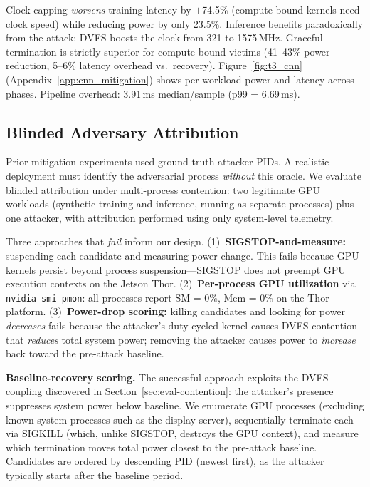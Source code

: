 \documentclass[letterpaper,twocolumn,10pt]{article}
\begin{document}
Clock capping \emph{worsens} training latency by $+$74.5\%
(compute-bound kernels need clock speed) while reducing power by
only 23.5\%.  Inference benefits paradoxically from the attack:
DVFS boosts the clock from 321 to 1575\,MHz.  Graceful termination
is strictly superior for compute-bound victims (41--43\% power
reduction, 5--6\% latency overhead vs.\ recovery).
Figure~\ref{fig:t3_cnn} (Appendix~\ref{app:cnn_mitigation})
shows per-workload power and latency across phases.
Pipeline overhead: 3.91\,ms median/sample (p99 = 6.69\,ms).

\subsection{Blinded Adversary Attribution}
\label{sec:mit-attribution}

Prior mitigation experiments used ground-truth attacker PIDs.
A realistic deployment must identify the adversarial process
\emph{without} this oracle.  We evaluate blinded attribution
under multi-process contention: two legitimate GPU workloads
(synthetic training and inference, running as separate processes)
plus one attacker, with attribution performed using only system-level
telemetry.

Three approaches that \emph{fail} inform our design.
(1)~\textbf{SIGSTOP-and-measure:} suspending each candidate and
measuring power change.  This fails because GPU kernels persist
beyond process suspension---SIGSTOP does not preempt GPU execution
contexts on the Jetson Thor.
(2)~\textbf{Per-process GPU utilization} via \texttt{nvidia-smi pmon}:
all processes report SM = 0\%, Mem = 0\% on the Thor platform.
(3)~\textbf{Power-drop scoring:} killing candidates and looking
for power \emph{decreases} fails because the attacker's duty-cycled
kernel causes DVFS contention that \emph{reduces} total system
power; removing the attacker causes power to \emph{increase}
back toward the pre-attack baseline.

\textbf{Baseline-recovery scoring.}
The successful approach exploits the DVFS coupling discovered
in Section~\ref{sec:eval-contention}: the attacker's presence
suppresses system power below baseline.  We enumerate GPU processes
(excluding known system processes such as the display server),
sequentially terminate each via SIGKILL (which, unlike SIGSTOP,
destroys the GPU context), and measure which termination moves
total power closest to the pre-attack baseline.  Candidates are
ordered by descending PID (newest first), as the attacker
typically starts after the baseline period.
\end{document}
